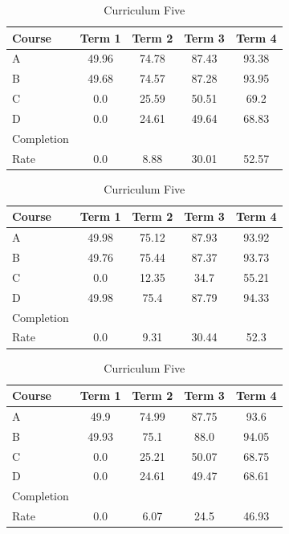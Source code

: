 \documentclass[botnum, fleqn]{unmeethesis}
\begin{document}
\begin{table}[!h]
  \vspace*{1cm}
  \begin{subtable}{0.45\linewidth}
    \centering
      \caption{Curriculum Three}
      \label{tab:simple91}
      \begin{tabular}{l*{4}{c}}
        Course  & Term 1 & Term 2 & Term 3 & Term 4 \\
        \hline
        A & 49.96 & 74.78 & 87.43 & 93.38 \\
        B & 49.68 & 74.57 & 87.28 & 93.95 \\
        C & 0.0   & 25.59 & 50.51 & 69.2  \\
        D & 0.0   & 24.61 & 49.64 & 68.83 \\
        \hline
        Completion \\ Rate & 0.0   & 8.88  & 30.01 & 52.57 \\
      \end{tabular}
  \end{subtable} 
  \hfill
  \begin{subtable}{0.45\linewidth}
    \centering
      \caption{Curriculum Four}
      \label{tab:simple92}
      \begin{tabular}{l*{4}{c}}
        Course  & Term 1 & Term 2 & Term 3 & Term 4 \\
        \hline
        A & 49.98 & 75.12 & 87.93 & 93.92 \\
        B & 49.76 & 75.44 & 87.37 & 93.73 \\
        C & 0.0   & 12.35 & 34.7  & 55.21 \\
        D & 49.98 & 75.4  & 87.79 & 94.33 \\
        \hline
        Completion \\ Rate & 0.0   & 9.31  & 30.44 & 52.3  \\
      \end{tabular}
  \end{subtable}

  \vspace*{1cm}
  \begin{subtable}{0.45\linewidth}
    \centering
      \caption{Curriculum Five}
      \label{tab:simple10}
      \begin{tabular}{l*{4}{c}}
        Course  & Term 1 & Term 2 & Term 3 & Term 4 \\
        \hline
        A & 49.9  & 74.99 & 87.75 & 93.6  \\
        B & 49.93 & 75.1  & 88.0  & 94.05 \\
        C & 0.0   & 25.21 & 50.07 & 68.75 \\
        D & 0.0   & 24.61 & 49.47 & 68.61 \\
        \hline
        Completion \\ Rate & 0.0   & 6.07  & 24.5  & 46.93 \\
      \end{tabular}
  \end{subtable} 
  \label{tab:simpleResults}
\end{table}
\end{document}
